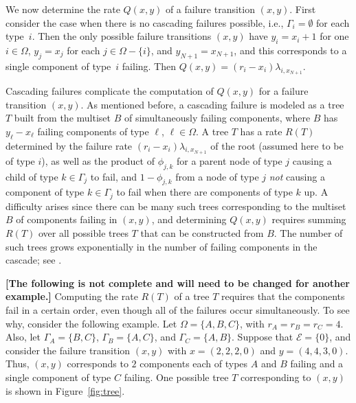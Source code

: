\documentclass[12pt]{article}
\begin{document}
We now determine the rate $Q(x,y)$ of
a failure transition $(x,y)$.
First consider the case when there is
no cascading failures possible,
i.e.,
$\Gamma_i = \emptyset$ for each type~$i$.
Then the only possible failure transitions
$(x,y)$ have
$y_i = x_i + 1$ for one $i \in \Omega$,
$y_j = x_j$ for each $j \in \Omega - \{ i \}$,
and
$y_{N+1} = x_{N+1}$,
and this corresponds to a single
component
of type~$i$ failing.
Then $Q(x,y) = (r_i - x_i)
\lambda_{i,x_{N+1}}$.

Cascading failures complicate the
computation of $Q(x,y)$
for a failure transition $(x,y)$.
As mentioned before, a cascading
failure is modeled as a tree $T$
built from the multiset $B$ of 
simultaneously failing
components,
where $B$ has
$y_\ell - x_\ell$ failing components
of type $\ell$, $\ell \in \Omega$.
A tree $T$ has a rate $R(T)$ determined
by the failure rate
$(r_i - x_i) \lambda_{i,x_{N+1}}$
of the root (assumed here to be of type $i$),
as well as the product of $\phi_{j,k}$
for a parent node of type $j$ causing
a child of type $k \in \Gamma_j$ to fail,
and $1 - \phi_{j,k}$ from
a node of type $j$
\textit{not} causing
a component of type $k \in \Gamma_j$
to fail when there are
components of type $k$ up.
A difficulty arises since
there can be many such trees
corresponding to the multiset $B$
of components failing in $(x,y)$,
and determining $Q(x,y)$ requires
summing $R(T)$ over all possible
trees $T$ that can be constructed
from $B$.
The number of such trees
grows exponentially in the
number of failing components in the
cascade; see \cite{ING:2009}.


\textbf{[The following is not complete
and will need to be changed
for another example.]}
Computing the rate $R(T)$ of a tree $T$
requires that the components fail
in a certain order, even though all
of the failures occur simultaneously.
To see why, consider the following example.
Let $\Omega = \{ A, B, C \}$,
with $r_A = r_B = r_C = 4$.
Also, let
$\Gamma_A = \{ B, C \}$,
$\Gamma_B = \{ A, C \}$,
and
$\Gamma_C = \{ A, B \}$.
Suppose that $\mathcal{E} = \{ 0 \}$,
and consider the failure transition
$(x,y)$ with
$x = (2, 2, 2, 0)$
and
$y = (4, 4, 3, 0)$.
Thus, $(x,y)$ corresponds
to $2$ components each of
types $A$ and $B$ failing
and a single component of type
$C$ failing.
One possible tree $T$
corresponding to $(x,y)$
is shown in Figure~\ref{fig:tree}.
\end{document}
